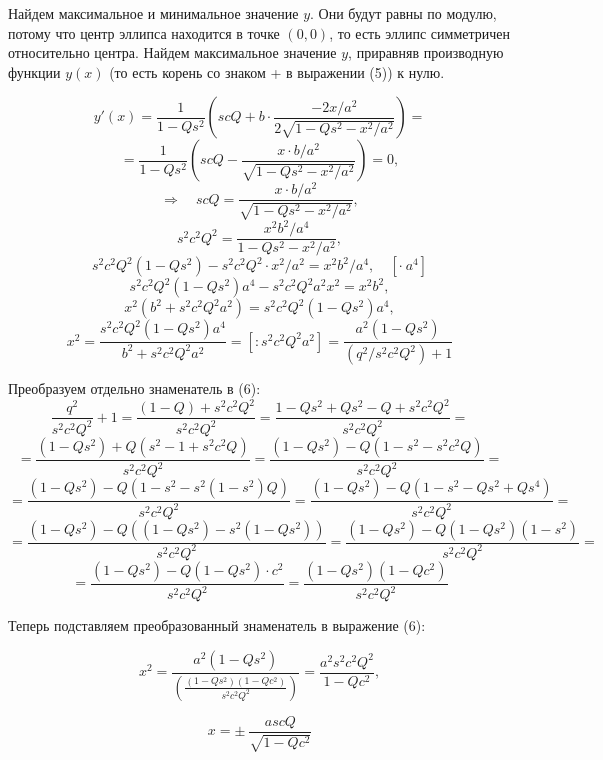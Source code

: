 \documentclass[14pt, a4paper]{article}
\begin{document}
Найдем максимальное и минимальное значение $y$. Они будут равны по модулю, потому что центр эллипса находится в точке $(0,0)$, то есть эллипс симметричен относительно центра. Найдем максимальное значение $y$, приравняв производную функции $y(x)$ (то есть корень со знаком + в выражении (5)) к нулю.

$$
	y'(x) = \frac{1}{1-Qs^2}\left(scQ + b \cdot \frac{-2x/a^2}{2\sqrt{1-Qs^2-x^2/a^2}}\right) =
$$
$$
	= \frac{1}{1-Qs^2}\left(scQ - \frac{x\cdot b/a^2}{\sqrt{1-Qs^2-x^2/a^2}}\right) = 0,
$$
$$
	\Rightarrow\quad  scQ = \frac{x\cdot b/a^2}{\sqrt{1-Qs^2-x^2/a^2}},
$$
$$
	s^2c^2Q^2 = \frac{x^2b^2/a^4}{1-Qs^2-x^2/a^2},
$$
$$
	s^2c^2Q^2(1-Qs^2) - s^2c^2Q^2\cdot x^2/a^2 = x^2b^2/a^4, \quad [\cdot \ a^4]
$$
$$
	s^2c^2Q^2(1-Qs^2)a^4 - s^2c^2Q^2a^2x^2 = x^2b^2,
$$
$$
	x^2(b^2+s^2c^2Q^2a^2) = s^2c^2Q^2(1-Qs^2)a^4,
$$
\begin{equation}
	x^2 = \frac{s^2c^2Q^2(1-Qs^2)a^4}{b^2+s^2c^2Q^2a^2} =
		[:s^2c^2Q^2a^2] = \frac{a^2(1-Qs^2)}{(q^2/s^2c^2Q^2) + 1}
\end{equation}

Преобразуем отдельно знаменатель в (6):
$$
	\frac{q^2}{s^2c^2Q^2} + 1 = \frac{(1-Q) + s^2c^2Q^2}{s^2c^2Q^2} =
	\frac{1 - Qs^2 + Qs^2 - Q + s^2c^2Q^2}{s^2c^2Q^2} =
$$
$$
	= \frac{(1-Qs^2) + Q(s^2-1+s^2c^2Q)}{s^2c^2Q^2} = 
	\frac{(1-Qs^2) - Q(1-s^2-s^2c^2Q)}{s^2c^2Q^2} =
$$
$$
	= \frac{(1-Qs^2) - Q(1-s^2-s^2(1-s^2)Q)}{s^2c^2Q^2} =
	\frac{(1-Qs^2) - Q(1-s^2-Qs^2+Qs^4)}{s^2c^2Q^2} =
$$
$$
	= \frac{(1-Qs^2) - Q((1-Qs^2)-s^2(1-Qs^2))}{s^2c^2Q^2} = 
	\frac{(1-Qs^2) - Q(1-Qs^2)(1-s^2)}{s^2c^2Q^2} =
$$
$$
	= \frac{(1-Qs^2) - Q(1-Qs^2)\cdot c^2}{s^2c^2Q^2} =
	\frac{(1-Qs^2)(1-Qc^2)}{s^2c^2Q^2}
$$

Теперь подставляем преобразованный знаменатель в выражение (6):

$$
	x^2 = \frac{a^2(1-Qs^2)}{\left(\frac{(1-Qs^2)(1-Qc^2)}{s^2c^2Q^2} \right)}	 = 
	\frac{a^2s^2c^2Q^2}{1-Qc^2},
$$

\begin{equation}
	x = \pm \ \frac{ascQ}{\sqrt{1-Qc^2}}
\end{equation}
\end{document}
